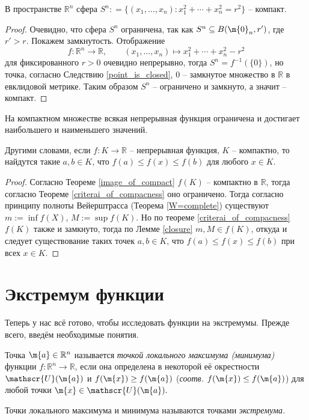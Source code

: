 \begin{corollary}\label{sphere_is_compact}
    В пространстве $\mathbb{R}^n$ сфера $S^n: =\{(x_1,\ldots, x_n): x_1^2 + \cdots +x_n^2 =r^2\}$ -- компакт.
\end{corollary}
\begin{proof}
 Очевидно, что сфера $S^n$ ограничена, так как $S^n \subseteq B(\m{0}_n, r')$, где $r'>r$. Покажем замкнутость. Отображение
 \[
  f: \mathbb{R}^n \to \mathbb{R}, \qquad (x_1,\ldots, x_n) \mapsto x_1^2 + \cdots + x_n^2 - r^2
 \]
 для фиксированного $r>0$ очевидно непрерывно, тогда $S^n= f^{-1}(\{0\})$, но точка, согласно Следствию \ref{point_is_closed}, $0$ -- замкнутое множество в $\mathbb{R}$ в евклидовой метрике. Таким образом $S^n$ -- ограничено и замкнуто, а значит -- компакт.
\end{proof}



\begin{theorem}\label{general_Weistrass}
    На компактном множестве всякая непрерывная функция ограничена и достигает наибольшего и наименьшего значений.
\end{theorem}
Другими словами, если $f:K \to \mathbb{R}$ -- непрерывная функция, $K$ -- компактно, то найдутся такие $a,b \in K$, что $f(a) \le f(x) \le f(b)$ для любого $x \in K$.

\begin{proof}
    Согласно Теореме \ref{image_of_compact} $f(K)$ -- компактно в $\mathbb{R}$, тогда согласно Теореме \ref{criterai_of_compacness} оно ограничено. Тогда согласно принципу полноты Вейерштрасса (Теорема \ref{W=complete}) существуют $m:=\inf f(X)$, $M:= \sup f(K).$ Но по теореме \ref{criterai_of_compacness} $f(K)$ также и замкнуто, тогда по Лемме \ref{closure} $m,M \in f(K)$, откуда и следует существование таких точек $a,b\in K$, что $f(a) \le f(x) \le f(b)$ при всех $x\in K.$
\end{proof}




\section{Экстремум функции}

Теперь у нас всё готово, чтобы исследовать функции на экстремумы. Прежде всего, введём необходимые понятия.

\begin{definition}
    Точка $\m{a} \in \mathbb{R}^n$ называется \textit{точкой локального максимума (минимума)} функции $f:\mathbb{R}^n \to \mathbb{R}$, если она определена в некоторой её окрестности $\mathscr{U}(\m{a})$ и $f(\m{x}) \ge f(\m{a})$ (\textit{соотв.} $f(\m{x}) \le f(\m{a})$) для любой точки $\m{x} \in \mathscr{U}(\m{a}).$

Точки локального максимума и минимума называются точками \textit{экстремума.}
\end{definition}

